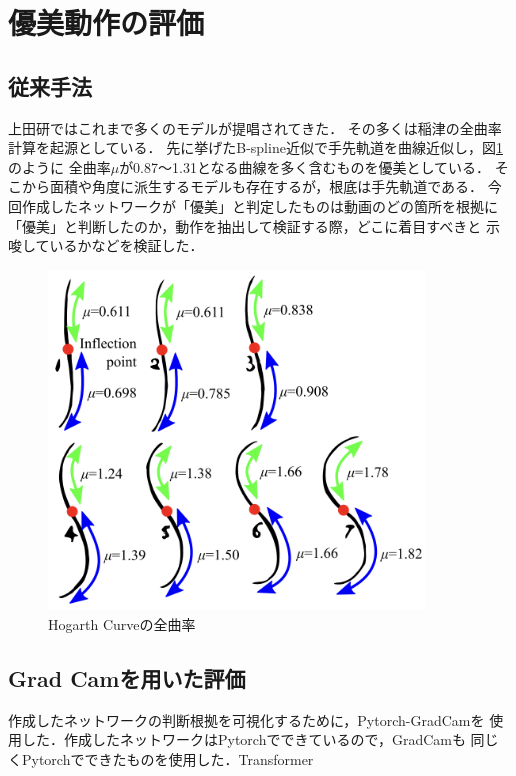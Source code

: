 \section{優美動作の評価}

\subsection{従来手法}
上田研ではこれまで多くのモデルが提唱されてきた．
その多くは稲津\cite{inazu2}の全曲率計算を起源としている．
先に挙げたB-spline近似で手先軌道を曲線近似し，図\ref{curves}のように
全曲率$\mu$が0.87〜1.31となる曲線を多く含むものを優美としている．
そこから面積や角度に派生するモデルも存在するが，根底は手先軌道である．
今回作成したネットワークが「優美」と判定したものは動画のどの箇所を根拠に
「優美」と判断したのか，動作を抽出して検証する際，どこに着目すべきと
示唆しているかなどを検証した．

\begin{figure}[b]
  \begin{center}
    \includegraphics[width=100mm]{images/quote/curves.png}
  \end{center}
  \caption{Hogarth Curveの全曲率}
  \label{curves}
\end{figure}

\subsection{Grad Camを用いた評価}
作成したネットワークの判断根拠を可視化するために，Pytorch-GradCam\cite{pygradcam}を
使用した．作成したネットワークはPytorch\cite{pytorch}でできているので，GradCamも
同じくPytorchでできたものを使用した．Transformer


